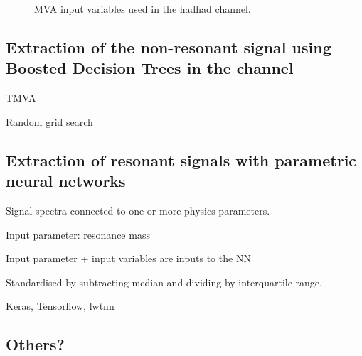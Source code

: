 \begin{figure}[p]
  \centering

  \begin{subfigure}[t]{.495\textwidth}
    \centering
  \end{subfigure}\hfill%
  \begin{subfigure}[t]{.495\textwidth}
    \centering
  \end{subfigure}

  \begin{subfigure}[t]{.495\textwidth}
    \centering
  \end{subfigure}\hfill%
  \begin{subfigure}[t]{.495\textwidth}
    \centering
  \end{subfigure}

  \begin{subfigure}[t]{.495\textwidth}
    \centering
  \end{subfigure}

  \caption{MVA input variables used in the hadhad channel.}
  \label{fig:mva_inputs}
\end{figure}



\subsection{Extraction of the non-resonant signal using Boosted
  Decision Trees in the \hadhad channel}
\label{sec:mva_smbdt}

TMVA


Random grid search






\subsection{Extraction of resonant signals with parametric neural networks}
\label{sec:mva_pnn}

Signal spectra connected to one or more physics parameters.

Input parameter: resonance mass \mX

Input parameter + input variables are inputs to the NN

Standardised by subtracting median and dividing by interquartile range.

Keras, Tensorflow, lwtnn






\subsection{Others?}



